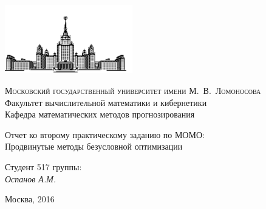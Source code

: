 \documentclass[12pt, a4paper]{article}
\begin{document}
    \thispagestyle{empty}

    \begin{singlespace}
    \begin{titlepage}
        \begin{center}
            \includegraphics[height = 3cm]{msu.png}

            {\scshape Московский государственный университет имени М.~В.~Ломоносова}\\
            Факультет вычислительной математики и кибернетики\\
            Кафедра математических методов прогнозирования\\
            \centerline{\hfill\hrulefill\hrulefill\hrulefill\hrulefill\hfill}

            \vfill

            {\LARGE Отчет ко второму практическому заданию по МОМО: \\ Продвинутые методы безусловной оптимизации}

            \vspace{1cm}

        \end{center}

        \vfill

        \begin{flushright}
            Студент 517 группы:\\
                \textit{Оспанов А.М.}

            \vspace{5mm}

        \end{flushright}

        \vfill

        \begin{center}
            Москва, 2016
        \end{center}
    \end{titlepage}
    \end{singlespace}

    \newpage

    \def \picwidth {17cm}
    \def \picheight {7.5cm}
\end{document}
